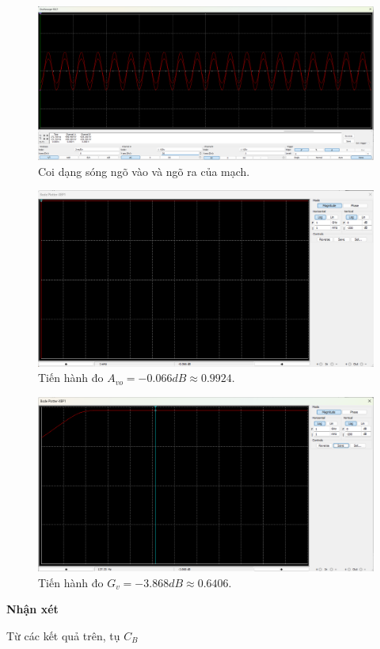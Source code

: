 \begin{itemize}[label=-]
	\begin{figure}[H]
		\centering
		\includegraphics[width=.8\linewidth]{./my-chapters/my-images/Question4/cauc_wave.png}
		\caption{Coi dạng sóng ngõ vào và ngõ ra của mạch.}
	\end{figure}
	
	\begin{figure}[H]
		\centering
		\includegraphics[width=.8\linewidth]{./my-chapters/my-images/Question4/cau_c_bode_avo.png}
		\caption{Tiến hành đo $A_{vo} = -0.066dB \approx 0.9924$.}
	\end{figure}
	
	\begin{figure}[H]
		\centering
		\includegraphics[width=.8\linewidth]{./my-chapters/my-images/Question4/cau_c_bode_gv.png}
		\caption{Tiến hành đo $G_{v} = -3.868dB \approx 0.6406$.}
	\end{figure}
\end{itemize}

\noindent\textbf{Nhận xét}

Từ các kết quả trên, tụ $C_{B}$ 